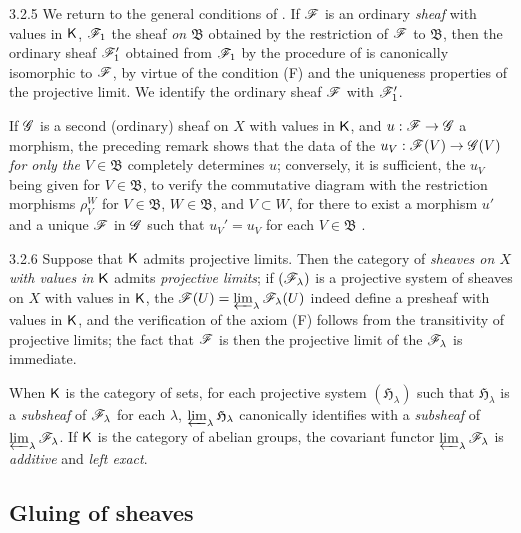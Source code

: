 \begin{env}{3.2.5}
\label{env-0.3.2.5}
We return to the general conditions of . If $\mathscr{F}$ is an
ordinary \emph{sheaf} with values in $\mathsf{K}$, $\mathscr{F}_1$ the sheaf \emph{on
$\mathfrak{B}$} obtained by the restriction of $\mathscr{F}$ to $\mathfrak{B}$, then
the ordinary sheaf $\mathscr{F}_1'$ obtained from $\mathscr{F}_1$ by the procedure of
 is canonically isomorphic to $\mathscr{F}$, by virtue of the
condition (F) and the uniqueness properties of the projective limit. We identify
the ordinary sheaf $\mathscr{F}$ with $\mathscr{F}_1'$.

If $\mathscr{G}$ is a second (ordinary) sheaf on $X$ with values in $\mathsf{K}$, and
$u:\mathscr{F}\to\mathscr{G}$ a morphism, the preceding remark shows that the data of the
$u_V:\mathscr{F}(V)\to\mathscr{G}(V)$ \emph{for only the $V\in\mathfrak{B}$} completely
determines $u$; conversely, it is sufficient, the $u_V$ being given for
$V\in\mathfrak{B}$, to verify the commutative diagram with the restriction
morphisms $\rho_V^W$ for $V\in\mathfrak{B}$, $W\in\mathfrak{B}$, and
$V\subset W$, for there to exist a morphism $u'$ and a unique $\mathscr{F}$ in
$\mathscr{G}$ such that $u_V'=u_V$ for each $V\in\mathfrak{B}$ .
\end{env}

\begin{env}{3.2.6}
\label{env-0.3.2.6}
Suppose that $\mathsf{K}$ admits projective limits. Then the category of \emph{sheaves
on $X$ with values in $\mathsf{K}$} admits \emph{projective limits}; if
$(\mathscr{F}_\lambda)$ is a projective system of sheaves on $X$ with values in $\mathsf{K}$,
the $\mathscr{F}(U)=\varprojlim_\lambda\mathscr{F}_\lambda(U)$ indeed define a presheaf
with values in $\mathsf{K}$, and the verification of the axiom (F) follows from the
transitivity of projective limits; the fact that $\mathscr{F}$ is then the projective
limit of the $\mathscr{F}_\lambda$ is immediate.

When $\mathsf{K}$ is the category of sets, for each projective system
$(\mathfrak{H}_\lambda)$ such
that $\mathfrak{H}_\lambda$ is a \emph{subsheaf} of $\mathscr{F}_\lambda$ for each
$\lambda$, $\varprojlim_\lambda\mathfrak{H}_\lambda$ canonically identifies with
a \emph{subsheaf} of $\varprojlim_\lambda\mathscr{F}_\lambda$. If $\mathsf{K}$ is the
category of abelian groups, the covariant functor
$\varprojlim_\lambda\mathscr{F}_\lambda$ is \emph{additive} and \emph{left exact}.
\end{env}

\subsection{Gluing of sheaves}
\label{0-prelim-3.3}

